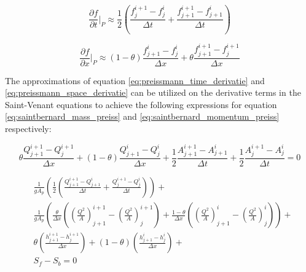 \begin{equation}\label{eq:preissmann_time_derivatie}
    \frac{\partial f}{\partial t}\bigg \rvert_P \approx \frac{1}{2}\left(\frac{f_j^{i+1}-f_j^i}{\Delta t}+\frac{f_{j+1}^{i+1}-f_{j+1}^i}{\Delta t}\right)
\end{equation}

\begin{equation}\label{eq:preissmann_space_derivatie}
    \frac{\partial f}{\partial x}\bigg \rvert_P \approx (1-\theta)\frac{f_{j+1}^i-f_{j}^i}{\Delta x}+\theta \frac{f_{j+1}^{i+1}-f_{j}^{i+1}}{\Delta x}
\end{equation}

The approximations of equation \ref{eq:preissmann_time_derivatie} and \ref{eq:preissmann_space_derivatie} can be utilized on the derivative terms in the Saint-Venant equations to achieve the following expressions for equation \ref{eq:saintbernard_mass_preiss} and \ref{eq:saintbernard_momentum_preiss} respectively:

\begin{equation}\label{eq:continuity_eq_preissmann}
    \theta \frac{Q_{j+1}^{i+1}-Q_j^{i+1}}{\Delta x}+(1-\theta)\frac{Q_{j+1}^i - Q_j^i}{\Delta x}+
    \frac{1}{2}\frac{A_{j+1}^{i+1}-A_{j+1}^i}{\Delta t} + \frac{1}{2} \frac{A_{j}^{i+1} - A_j^i}{\Delta t} = 0
\end{equation}

\begin{equation}\label{eq:Momentum_eq_preissmann_discrete}
\begin{aligned}
    &\frac{1}{gA_p}\left(\frac{1}{2} \left(\frac{Q_{j+1}^{i+1}-Q_{j+1}^i}{\Delta t}+\frac{Q_{j}^{i+1} - Q_j^i}{\Delta t}\right)\right) +  \\[6pt]
   &\frac{1}{gA_p}\left(\frac{\theta}{\Delta x} \left(\left(\frac{Q^2}{A}\right)_{j+1}^{i+1}-\left(\frac{Q^2}{A}\right)_{j}^{i+1}\right) +  \frac{1-\theta}{\Delta x}\left(\left(\frac{Q^2}{A}\right)_{j+1}^{i}-\left(\frac{Q^2}{A}\right)_{j}^{i}\right) \right) + \\[6pt]
   &\theta \left(\frac{h_{j+1}^{i+1}-h_j^{i+1}}{\Delta x}\right)+ (1-\theta)\left(\frac{h_{j+1}^{i} - h_j^i}{\Delta x}\right) + \\[4pt] 
   &S_f-S_b= 0
    \end{aligned}
\end{equation}

